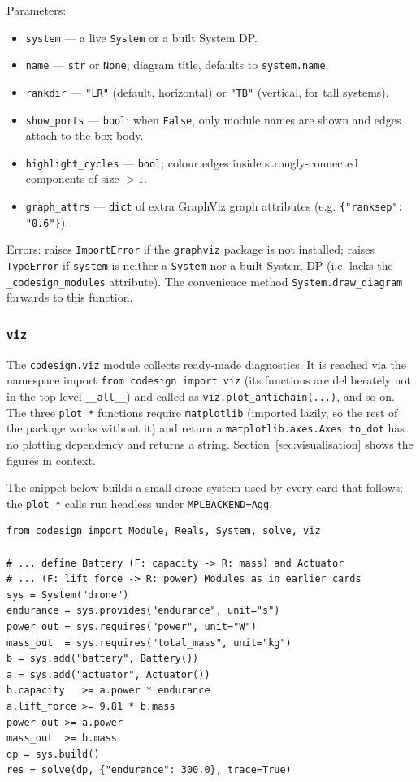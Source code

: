 \documentclass[11pt,a4paper]{article}
\begin{document}
Parameters:
\begin{itemize}[nosep]
  \item \texttt{system} --- a live \texttt{System} or a built System DP.
  \item \texttt{name} --- \texttt{str} or \texttt{None}; diagram title,
        defaults to \texttt{system.name}.
  \item \texttt{rankdir} --- \texttt{"LR"} (default, horizontal) or
        \texttt{"TB"} (vertical, for tall systems).
  \item \texttt{show\_ports} --- \texttt{bool}; when \texttt{False}, only
        module names are shown and edges attach to the box body.
  \item \texttt{highlight\_cycles} --- \texttt{bool}; colour edges inside
        strongly-connected components of size $>1$.
  \item \texttt{graph\_attrs} --- \texttt{dict} of extra GraphViz graph
        attributes (e.g. \texttt{\{"ranksep": "0.6"\}}).
\end{itemize}

Errors: raises \texttt{ImportError} if the \texttt{graphviz} package is not
installed; raises \texttt{TypeError} if \texttt{system} is neither a
\texttt{System} nor a built System DP (i.e. lacks the
\texttt{\_codesign\_modules} attribute). The convenience method
\texttt{System.draw\_diagram} forwards to this function.

\subsubsection{\texttt{viz}}
\label{ref:viz}

The \texttt{codesign.viz} module collects ready-made diagnostics. It is
reached via the namespace import \texttt{from codesign import viz} (its
functions are deliberately not in the top-level \texttt{\_\_all\_\_}) and
called as \texttt{viz.plot\_antichain(...)}, and so on. The three
\texttt{plot\_*} functions require \texttt{matplotlib} (imported lazily,
so the rest of the package works without it) and return a
\texttt{matplotlib.axes.Axes}; \texttt{to\_dot} has no plotting dependency
and returns a string. Section~\ref{sec:visualisation} shows the figures in
context.

The snippet below builds a small drone system used by every card that
follows; the \texttt{plot\_*} calls run headless under
\texttt{MPLBACKEND=Agg}.

\begin{lstlisting}
from codesign import Module, Reals, System, solve, viz

# ... define Battery (F: capacity -> R: mass) and Actuator
# ... (F: lift_force -> R: power) Modules as in earlier cards
sys = System("drone")
endurance = sys.provides("endurance", unit="s")
power_out = sys.requires("power", unit="W")
mass_out  = sys.requires("total_mass", unit="kg")
b = sys.add("battery", Battery())
a = sys.add("actuator", Actuator())
b.capacity   >= a.power * endurance
a.lift_force >= 9.81 * b.mass
power_out >= a.power
mass_out  >= b.mass
dp = sys.build()
res = solve(dp, {"endurance": 300.0}, trace=True)
\end{lstlisting}
\end{document}
